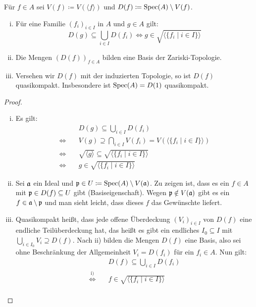\begin{prop}
\label{prop:4.8}
	Für $f \in A$ sei $V(f) \coloneqq V(\langle f \rangle)$ und $D(f)\coloneqq \operatorname{Spec}(A) \setminus V(f)$.
	\begin{enumerate}[i)]
		\item Für eine Familie $(f_i)_{i\in I}$ in $A$ und $g \in A$ gilt:
		\[
			D(g) \subseteq \bigcup_{i\in I}D(f_i) \Leftrightarrow g \in \sqrt{\langle \{f_i \mid i \in I\}\rangle}
		\]
		\item Die Mengen $(D(f))_{f\in A}$ bilden eine Basis der Zariski-Topologie.
		\item Versehen wir $D(f)$ mit der induzierten Topologie, so ist $D(f)$ quasikompakt. Insbesondere ist $\operatorname{Spec}(A)=D(1)$ quasikompakt.
	\end{enumerate}
	\begin{proof}
		\begin{enumerate}[i)]
			\item Es gilt:
			\begin{align*}
				&D(g) \subseteq \bigcup_{i\in I} D(f_i)\\
				\Longleftrightarrow \quad & V(g) \supseteq \bigcap_{i \in I} V(f_i) = V(\langle\{f_i\mid i \in I\}\rangle)\\
				\Longleftrightarrow \quad & \sqrt{\langle g \rangle} \subseteq \sqrt{\langle\{f_i\mid i \in I\}\rangle}\\
				\Longleftrightarrow \quad & g \in \sqrt{\langle\{f_i\mid i \in I\}\rangle}
			\end{align*}
			\item Sei $\mathfrak{a}$ ein Ideal und $\mathfrak{p} \in U \coloneqq \operatorname{Spec}(A) \setminus V(\mathfrak{a})$. Zu zeigen ist, dass es ein $f \in A$ mit $\mathfrak{p} \in D(f) \subseteq U$ gibt (Basiseigenschaft). Wegen $\mathfrak{p} \notin V(\mathfrak{a})$ gibt es ein $f \in \mathfrak{a} \setminus \mathfrak{p}$ und man sieht leicht, dass dieses $f$ das Gewünschte liefert.
			\item Quasikompakt heißt, dass jede offene Überdeckung $(V_i)_{i\in I}$ von $D(f)$ eine endliche Teilüberdeckung hat, das heißt es gibt ein endliches $I_0 \subseteq I$ mit $\bigcup_{i\in I_0} V_i \supseteq D(f)$. Nach ii) bilden die Mengen $D(f)$ eine Basis, also sei ohne Beschränkung der Allgemeinheit $V_i = D(f_i)$ für ein $f_i \in A$. Nun gilt:
			\begin{align*}
				&D(f) \subseteq \bigcup_{i \in I} D(f_i)\\
				\overset{\text{i)}}{\Longleftrightarrow} \quad & f \in \sqrt{\langle \{f_i \mid i \in I\}\rangle}\\

\end{align*}
\end{enumerate}
\end{proof}
\end{prop}
